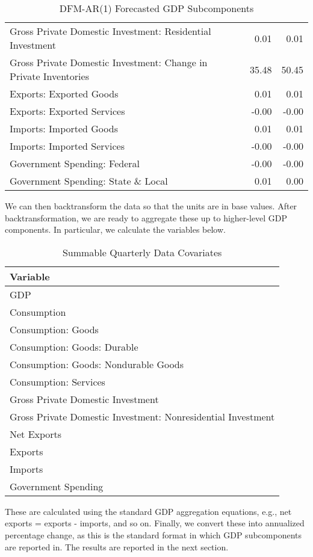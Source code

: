 \documentclass[11pt, letterpaper]{article}\usepackage[]{graphicx}\usepackage[]{color}
\begin{document}
\begin{table}[H]
\begin{tabular}{lrrr}
  Gross Private Domestic Investment: Residential Investment &  & 0.01 & 0.01 \\ 
  Gross Private Domestic Investment: Change in Private Inventories &  & 35.48 & 50.45 \\ 
  Exports: Exported Goods &  & 0.01 & 0.01 \\ 
  Exports: Exported Services &  & -0.00 & -0.00 \\ 
  Imports: Imported Goods &  & 0.01 & 0.01 \\ 
  Imports: Imported Services &  & -0.00 & -0.00 \\ 
  Government Spending: Federal &  & -0.00 & -0.00 \\ 
  Government Spending: State \& Local &  & 0.01 & 0.00 \\ 
   \hline
\end{tabular}
\endgroup
\caption{DFM-AR(1) Forecasted GDP Subcomponents} 
\end{table}


We can then backtransform the data so that the units are in base values. After backtransformation, we are ready to aggregate these up to higher-level GDP components. In particular, we calculate the variables below.
\begin{table}[H]
\centering
\begingroup\scriptsize
\begin{tabular}{l}
  \hline
Variable \\ 
  \hline
GDP \\ 
  Consumption \\ 
  Consumption: Goods \\ 
  Consumption: Goods: Durable \\ 
  Consumption: Goods: Nondurable Goods \\ 
  Consumption: Services \\ 
  Gross Private Domestic Investment \\ 
  Gross Private Domestic Investment: Nonresidential Investment \\ 
  Net Exports \\ 
  Exports \\ 
  Imports \\ 
  Government Spending \\ 
   \hline
\end{tabular}
\endgroup
\caption{Summable Quarterly Data Covariates} 
\end{table}

These are calculated using the standard GDP aggregation equations, e.g., net exports = exports - imports, and so on.
Finally, we convert these into annualized percentage change, as this is the standard format in which GDP subcomponents are reported in. The results are reported in the next section.
\end{document}
